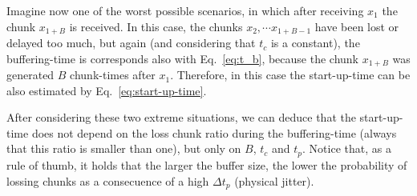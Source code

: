 Imagine now one of the worst possible scenarios, in which after
receiving $x_1$ the chunk $x_{1+B}$ is received. In this case, the
chunks $x_2, \cdots x_{1+B-1}$ have been lost or delayed too much, but
again (and considering that $t_c$ is a constant), the buffering-time
is corresponds also with Eq.~\ref{eq:t_b}, because the chunk $x_{1+B}$
was generated $B$ chunk-times after $x_1$. Therefore, in this case the
start-up-time can be also estimated by Eq.~\ref{eq:start-up-time}.

After considering these two extreme situations, we can deduce that the
start-up-time does not depend on the loss chunk ratio during the
buffering-time (always that this ratio is smaller than one), but only
on $B$, $t_c$ and $t_p$. Notice that, as a rule of thumb, it holds
that the larger the buffer size, the lower the probability of lossing
chunks as a consecuence of a high $\Delta t_p$ (physical jitter).
